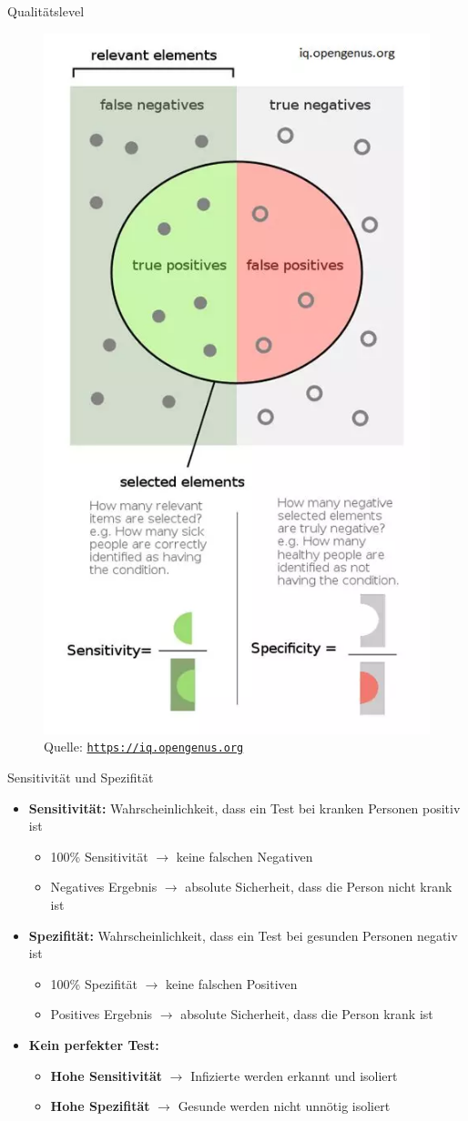 \documentclass[ngerman,14pt,aspectratio=1610]{beamer}
\newcommand{\source}{}
\begin{document}
	\renewcommand{\source}{ }
	
	\begin{frame}[t]{Qualitätslevel}
		\begin{figure}[h]
			\centering
			\includegraphics[width=0.28\linewidth]{sensitivity-specificity}
			\tiny Quelle: \href{https://iq.opengenus.org/precision-recall-sensitivity-specificity/}{\texttt{https://iq.opengenus.org}}
		\end{figure}
	\end{frame}
	
	\renewcommand{\source}{Quelle: \url{https://arxiv.org/pdf/2210.13089}}
	
	\begin{frame}[t]{Sensitivität und Spezifität}
		\begin{itemize}
			\item \textbf{\alert{Sensitivität:}} Wahrscheinlichkeit, dass ein Test bei kranken Personen positiv ist
			\begin{itemize}
				\item 100\% Sensitivität $\rightarrow$ keine falschen Negativen
				\item Negatives Ergebnis $\rightarrow$ absolute Sicherheit, dass die Person nicht krank ist
			\end{itemize}
			
			\item \textbf{\alert{Spezifität:}} Wahrscheinlichkeit, dass ein Test bei gesunden Personen negativ ist
			\begin{itemize}
				\item 100\% Spezifität $\rightarrow$ keine falschen Positiven
				\item Positives Ergebnis $\rightarrow$ absolute Sicherheit, dass die Person krank ist
			\end{itemize}
		
			\item \textbf{Kein perfekter Test:}
			\begin{itemize}
				\item \textbf{Hohe Sensitivität} $\rightarrow$ Infizierte werden erkannt und isoliert
				\item \textbf{Hohe Spezifität} $\rightarrow$ Gesunde werden nicht unnötig isoliert
			\end{itemize}
		\end{itemize}
	\end{frame}
	
\end{document}
